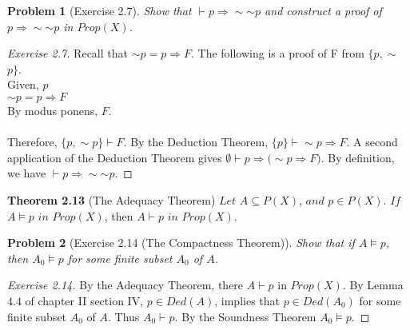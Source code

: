 \documentclass{article}
\theoremstyle{problemstyle}
\newtheorem{problem}{Problem}
\begin{document}
\begin{problem}[Exercise 2.7]
Show that  $\vdash p\Rightarrow \sim$$\sim$$p$ and construct a proof of $p \Rightarrow \sim$$\sim$$p$ in $Prop(X)$. 
\end{problem}
\begin{proof}[Exercise 2.7]
Recall that $\sim$$p = p\Rightarrow F$. The following is a proof of F from $\{p,\sim$$p\}$. \\Given, $p$\\$\sim$$p = p \Rightarrow F$\\By modus ponens, $F$.\\\\ Therefore,  $\{p,\sim$$p\}\vdash F$. By the Deduction Theorem, $\{p\}\vdash \sim$$p\Rightarrow F$. A second application of the Deduction Theorem gives $\emptyset\vdash p\Rightarrow(\sim$$p\Rightarrow F)$. By definition, we have $\vdash p\Rightarrow\sim$$\sim$$p$. 
\end{proof}

\begin{flushleft}
\textbf{Theorem 2.13} (The Adequacy Theorem) $Let$ $A \subseteq P(X)$, $and$ $p \in P(X)$. $If$ $A \models p$ $in$ $Prop(X)$, then $A\vdash p$ $in$ $Prop(X)$. 
\end{flushleft}
 
 \begin{problem}[Exercise 2.14 (The Compactness Theorem)]
Show that if $A \models p$, then $A_0 \models p$ for some finite subset $A_0$ of $A$. 
\end{problem}
\begin{proof}[Exercise 2.14]
By the Adequacy Theorem, there $A \vdash p$ in $Prop(X)$. By Lemma $4.4$ of chapter II section IV, $p \in Ded(A)$, implies that $p \in Ded(A_0)$ for some finite subset $A_0$ of $A$. Thus $A_0\vdash p$. By the Soundness Theorem $A_0 \models p$. 
\end{proof}
\end{document}
